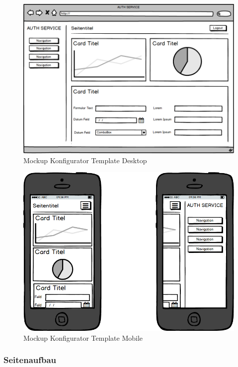 \begin{figure}[htbp]
\centering
\includegraphics{images/mockups/General.png}
\caption{Mockup Konfigurator Template Desktop}
\end{figure}

\newpage

\begin{figure}[htbp]
\centering
\includegraphics{images/mockups/Mobile.png}
\caption{Mockup Konfigurator Template Mobile}
\end{figure}

\subsubsection{Seitenaufbau}\label{seitenaufbau}

